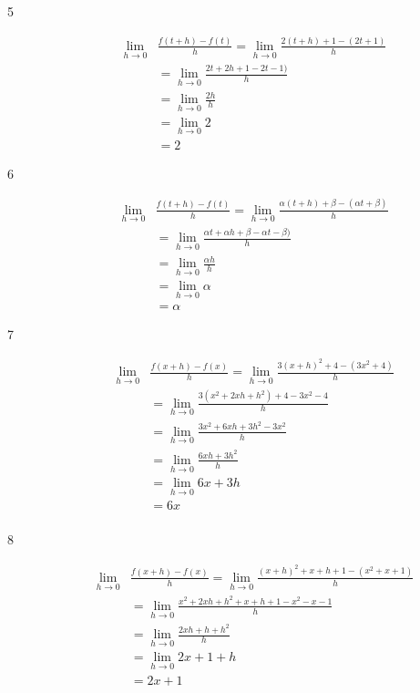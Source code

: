 \documentclass{exam}
\begin{document}
\begin{description}
\item[5]
\begin{align*}
  \lim_{h \to 0} &\frac{f(t+h) - f(t)}{h} = \lim_{h \to 0} \frac{2(t + h) + 1 - (2t + 1)}{h} \\
  &= \lim_{h \to 0} \frac{2t + 2h + 1 - 2t - 1)}{h} \\
  &= \lim_{h \to 0} \frac{2h}{h} \\
  &= \lim_{h \to 0} 2 \\
  &= 2
\end{align*}

\item[6]
\begin{align*}
  \lim_{h \to 0} &\frac{f(t+h) - f(t)}{h} = \lim_{h \to 0} \frac{\alpha(t + h) + \beta - (\alpha t + \beta)}{h} \\
  &= \lim_{h \to 0} \frac{\alpha t + \alpha h + \beta - \alpha t - \beta)}{h} \\
  &= \lim_{h \to 0} \frac{\alpha h}{h} \\
  &= \lim_{h \to 0} \alpha  \\
  &= \alpha
\end{align*}

\item[7]
\begin{align*}
  \lim_{h \to 0} &\frac{f(x+h) - f(x)}{h} = \lim_{h \to 0} \frac{3(x + h)^2 + 4 - (3x^2 + 4)}{h} \\
  &= \lim_{h \to 0} \frac{3(x^2 + 2xh + h^2) + 4 - 3x^2 - 4}{h} \\
  &= \lim_{h \to 0} \frac{3x^2 + 6xh + 3h^2 - 3x^2}{h} \\
  &= \lim_{h \to 0} \frac{6xh + 3h^2}{h} \\
  &= \lim_{h \to 0} 6x + 3h \\
  &= 6x \\
\end{align*}

\item[8]
\begin{align*}
  \lim_{h \to 0} &\frac{f(x+h) - f(x)}{h} = \lim_{h \to 0} \frac{(x + h)^2 + x+h + 1 - (x^2 + x + 1)}{h} \\
  &= \lim_{h \to 0} \frac{x^2 + 2xh + h^2 + x+h + 1 - x^2 - x - 1}{h} \\
  &= \lim_{h \to 0} \frac{2xh + h + h^2}{h} \\
  &= \lim_{h \to 0} 2x + 1 + h \\
  &= 2x + 1 \\
\end{align*}


\end{description}
\end{document}
